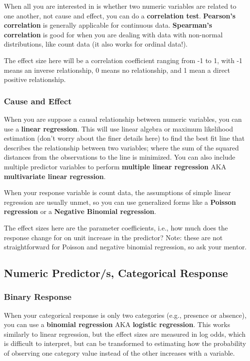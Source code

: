 \documentclass[
  letterpaper,
  DIV=11,
  numbers=noendperiod]{scrreprt}
\begin{document}
When all you are interested in is whether two numeric variables are
related to one another, not cause and effect, you can do a
\textbf{correlation test}. \textbf{Pearson's correlation} is generally
applicable for continuous data. \textbf{Spearman's correlation} is good
for when you are dealing with data with non-normal distributions, like
count data (it also works for ordinal data!).

The effect size here will be a correlation coefficient ranging from -1
to 1, with -1 means an inverse relationship, 0 means no relationship,
and 1 mean a direct positive relationship.

\subsubsection{Cause and Effect}\label{sec-reg}

When you are suppose a causal relationship between numeric variables,
you can use a \textbf{linear regression}. This will use linear algebra
or maximum likelihood estimation (don't worry about the finer details
here) to find the best fit line that describes the relationship between
two variables; where the sum of the squared distances from the
observations to the line is minimized. You can also include multiple
predictor variables to perform \textbf{multiple linear regression} AKA
\textbf{multivariate linear regression}.

When your response variable is count data, the assumptions of simple
linear regression are usually unmet, so you can use generalized forms
like a \textbf{Poisson regression} or a \textbf{Negative Binomial
regression}.

The effect sizes here are the parameter coefficients, i.e., how much
does the response change for on unit increase in the predictor? Note:
these are not straightforward for Poisson and negative binomial
regression, so ask your mentor.

\subsection{Numeric Predictor/s, Categorical
Response}\label{numeric-predictors-categorical-response}

\subsubsection{Binary Response}\label{sec-bin}

When your categorical response is only two categories (e.g., presence or
absence), you can use a \textbf{binomial regression} AKA
\textbf{logistic regression}. This works similarly to linear regression,
but the effect sizes are measured in log odds, which is difficult to
interpret, but can be transformed to estimating how the probability of
observing one category value instead of the other increases with a
variable.
\end{document}
